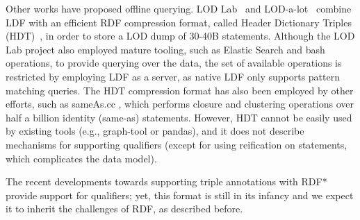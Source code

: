 \documentclass[runningheads]{llncs}
\newcommand{\kibitz}[2]{%
{\color{#1}#2}{}%
}
\newcommand{\filip}[1]{\kibitz{purple}{[FI:#1]}} %
\newcommand{\DS}[1]{\kibitz{blue}{[DS: #1]}} %
\newcommand{\DG}[1]{\kibitz{red}{[DG: #1]}} %
\begin{document}
Other works have proposed offline querying. LOD Lab~\cite{beek2016lod} and LOD-a-lot~\cite{fernandez2017lod}  combine LDF with an efficient RDF compression format, called Header Dictionary Triples (HDT)~\cite{martinez2012exchange,fernandez2018hdtq}, in order to store a LOD dump of 30-40B statements. Although the LOD Lab project also employed mature tooling, such as Elastic Search and bash operations, to provide querying over the data, the set of available operations is restricted by employing LDF as a server, as native LDF only supports pattern matching queries. %
The HDT compression format has also been employed by other efforts, such as sameAs.cc \cite{beek2018sameas}, which performs closure and clustering operations over half a billion identity (same-as) statements. However, HDT cannot be easily used by existing tools (e.g., graph-tool or pandas), and it does not describe mechanisms for supporting qualifiers (except for using reification on statements, which complicates the data model). 

The recent developments towards supporting triple annotations with  RDF*~\cite{hartig2017rdf} provide support for qualifiers; yet, this format is still in its infancy and we expect it to inherit the challenges of RDF, as described before.%

\end{document}
